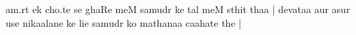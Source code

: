 \documentclass{article}
\begin{document}
am.rt ek cho.te se ghaRe meM samudr ke tal meM sthit thaa | devataa aur asur
use nikaalane ke lie samudr ko mathanaa caahate the |
\end{document}
